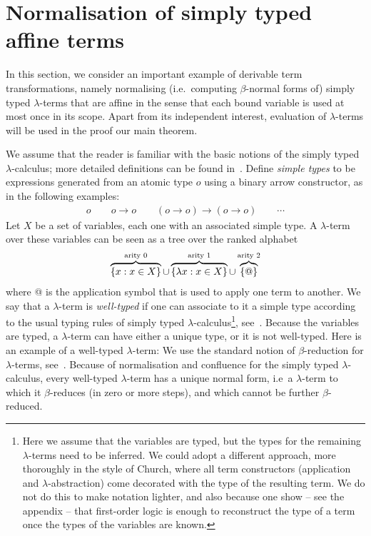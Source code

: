 \section{Normalisation of simply typed affine terms}
\label{sec:one-register}

In this section, we consider an important example of derivable term transformations, namely normalising (i.e.~computing $\beta$-normal forms of)  simply typed  $\lambda$-terms that are affine in the sense that each bound variable is used at most  once in its scope. Apart from its independent interest, evaluation of $\lambda$-terms will  be used in the proof our main theorem. 



\newcommand{\otype}{o}
We assume that the reader is familiar with the basic notions of the simply typed $\lambda$-calculus; more detailed definitions can be found in~\cite{sorensen_lectures_2006}. Define  \emph{simple types} to be expressions  generated from an atomic type $\otype$ using a binary arrow constructor, as in the following examples:
    \begin{align*}
        \otype \qquad \otype \to \otype \qquad (\otype \to \otype) \to (\otype \to \otype) \qquad \cdots 
    \end{align*}
Let $X$ be a set of variables, each one with an associated simple type.  A $\lambda$-term over these variables can be seen as a tree over the ranked alphabet
\begin{align*}
      \overbrace{\{x : x \in X\}}^{\text{arity 0}} \cup \overbrace{\{\lambda x : x \in X\}}^{\text{arity 1}} \cup  \overbrace{\{@\}}^{\text{arity 2}}
\end{align*}
where @ is the application symbol that is used to apply one term to another.
We say that a $\lambda$-term is \emph{well-typed} if one can associate  to it  a simple type according to the usual typing rules of simply typed $\lambda$-calculus\footnote{
    Here we assume that the variables are typed, but the types for the remaining $\lambda$-terms need to be inferred. We could adopt a different approach, more thoroughly in the style of Church, where all term constructors (application and $\lambda$-abstraction) come decorated with the type of the resulting term. We do not do this to make  notation lighter, and also because one show -- see the appendix -- that first-order logic is enough to reconstruct the type of a term once the types of the variables are known. 
}, see~\cite[Definition 3.2.1]{sorensen_lectures_2006}. Because the variables are typed, a  $\lambda$-term can have either a unique type, or it is not well-typed.  Here is an example of a well-typed $\lambda$-term: 
We use the standard notion of $\beta$-reduction for $\lambda$-terms, see~\cite[Definition 1.2.1]{sorensen_lectures_2006}. 
Because of normalisation and confluence for the simply typed $\lambda$-calculus, every well-typed $\lambda$-term has a unique normal form, i.e~a $\lambda$-term to which it $\beta$-reduces (in zero or more steps), and which cannot be further $\beta$-reduced.


